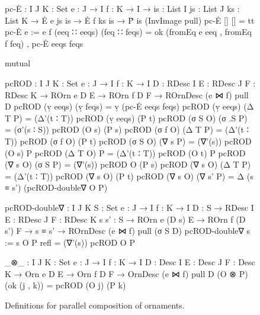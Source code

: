 \begin{figure}
\setlength{\mathindent}{0em}
\begin{code}
pc-Ė :  {I J K : Set} {e : J → I} {f : K → I} →
        {is : List I} {js : List J} {ks : List K} →
        Ė e js is → Ė f ks is → Ṗ is (InvImage pull)
pc-Ė               []            []            =  tt
pc-Ė {e := e} {f}  (eeq ∷ eeqs)  (feq ∷ feqs)  =  ok (fromEq e eeq , fromEq f feq) ,
                                                  pc-Ė eeqs feqs

mutual

  pcROD :  {I J K : Set} {e : J → I} {f : K → I}
            {D : RDesc I} {E : RDesc J} {F : RDesc K} →
            ROrn e D E → ROrn f D F → ROrnDesc (e ⋈ f) pull D
  pcROD (ṿ eeqs)    (ṿ feqs)  = ṿ (pc-Ė eeqs feqs)
  pcROD (ṿ eeqs)    (Δ T P)   = (Δ'(t ∶ T))  pcROD (ṿ eeqs)  (P t)
  pcROD (σ S O)     (σ .S P)  = (σ'(s ∶ S))  pcROD (O s)    (P s)
  pcROD (σ f O)     (Δ T P)   = (Δ'(t ∶ T))  pcROD (σ f O)  (P t)
  pcROD (σ S O)     (∇ s P)   = (∇'(s))      pcROD (O s)    P
  pcROD (Δ T O)     P         = (Δ'(t ∶ T))  pcROD (O t)    P
  pcROD (∇ s O)     (σ S P)   = (∇'(s))      pcROD O        (P s)
  pcROD (∇ s O)     (Δ T P)   = (Δ'(t ∶ T))  pcROD (∇ s O)  (P t)
  pcROD (∇ s O)     (∇ s' P)  = Δ (s ≡ s') (pcROD-double∇ O P)

  pcROD-double∇ :
    {I J K S : Set} {e : J → I} {f : K → I}
    {D : S → RDesc I} {E : RDesc J} {F : RDesc K} {s s' : S} →
    ROrn e (D s) E → ROrn f (D s') F →
    s ≡ s' → ROrnDesc (e ⋈ f) pull (σ S D)
  pcROD-double∇ {s := s} O P refl = (∇'(s)) pcROD O P

_⊗_ :  {I J K : Set} {e : J → I} {f : K → I}
       {D : Desc I} {E : Desc J} {F : Desc K} →
       Orn e D E → Orn f D F → OrnDesc (e ⋈ f) pull D
(O ⊗ P) (ok (j , k)) = pcROD (O j) (P k)
\end{code}
\caption{Definitions for parallel composition of ornaments.}
\label{fig:parallel-composition}
\end{figure}


